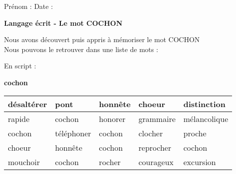 \documentclass[a4paper, 11pt]{article}
\begin{document}
\sloppy
\pagestyle{empty}
\begin{onehalfspace}

\sffamily 
\noindent \Large Prénom : \fbox{
    \begin{minipage}{9cm}
        \vspace{1.2cm} \hspace{9cm}
    \end{minipage}
} \hspace{1.5cm}\Large Date : \vspace{2mm}\\
\begin{minipage}{12cm}
    \begin{center}
    \Large \bfseries Langage écrit - Le mot \MakeUppercase{
        cochon
    }
    \end{center}
    \normalsize Nous avons découvert puis appris à mémoriser le mot \MakeUppercase{
        cochon
    }\\
    Nous pouvons le retrouver dans une liste de mots :
\end{minipage}

\vspace{0.25cm} 

{\large
\noindent En script :

\begin{center}
    {\huge \bfseries
        cochon
    }
    \vspace{0.25cm}\\
    \begin{tabulary}{17cm}{|h|h|h|h|h|}
    \hline

    désaltérer & pont & honnête & choeur & distinction\\\hline
rapide & cochon & honorer & grammaire & mélancolique\\\hline
cochon & téléphoner & cochon & clocher & proche\\\hline
choeur & honnête & cochon & reprocher & cochon\\\hline
mouchoir & cochon & rocher & courageux & excursion\\\hline


    \end{tabulary}
\end{center}
}
\vspace{0.5cm}


\end{onehalfspace}
\end{document}

